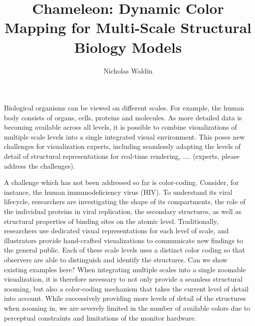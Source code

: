 \documentclass[review,journal]{vgtc}         %
\title{Chameleon: Dynamic Color Mapping	for Multi-Scale Structural Biology Models}
\author{Nicholas Waldin}
\begin{document}

\maketitle

Biological organisms can be viewed on different scales. 
For example, the human body consists of organs, cells, proteins and molecules. As more detailed data is becoming available across all levels, it is possible to combine visualizations of multiple scale levels into a single integrated visual environment. 
This poses new challenges for visualization experts, including seamlessly adapting the levels of detail of structural representations for real-time rendering, .... (experts, please address the challenges).

A challenge which has not been addressed so far is color-coding. Consider, for instance, the human immunodeficiency virus (HIV).
To understand its viral lifecycle, researchers are investigating the shape of its compartments, the role of the individual proteins in viral replication, the secondary structures, as well as structural properties of binding sites on the atomic level. 
Traditionally, researchers use dedicated visual representations for each level of scale, and illustrators provide hand-crafted visualizations to communicate new findings to the general public. 
Each of these scale levels uses a distinct color coding so that observers are able to distinguish and identify the structures. Can we show existing examples here? 
When integrating multiple scales into a single zoomable visualization, it is therefore necessary to not only provide a seamless structural zooming, but also a color-coding mechanism that takes the current level of detail into account. 
While successively providing more levels of detail of the structures when zooming in, we are severely limited in the number of available colors due to perceptual constraints and limitations of the monitor hardware. 
\end{document}
